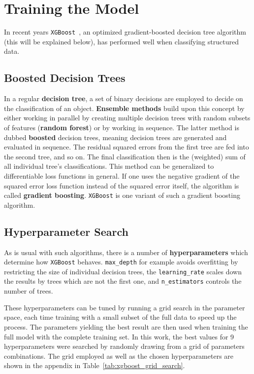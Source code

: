 \section{Training the Model}
In recent years \texttt{XGBoost}~, an optimized gradient-boosted decision tree algorithm (this will be explained below), has performed well when classifying structured data.

\subsection{Boosted Decision Trees}
In a regular \textbf{decision tree}, a set of binary decisions are employed to decide on the classification of an object. \textbf{Ensemble methods} build upon this concept by either working in parallel by creating multiple decision trees with random subsets of features (\textbf{random forest}) or by working in sequence. The latter method is dubbed \textbf{boosted} decision trees, meaning decision trees are generated and evaluated in sequence. The residual squared errors from the first tree are fed into the second tree, and so on. The final classification then is the (weighted) sum of all individual tree's classifications. This method can be generalized to differentiable loss functions in general. If one uses the negative gradient of the squared error loss function instead of the squared error itself, the algorithm is called \textbf{gradient boosting}. \texttt{XGBoost} is one variant of such a gradient boosting algorithm.

\subsection{Hyperparameter Search}
As is usual with such algorithms, there is a number of \textbf{hyperparameters} which determine how \texttt{XGBoost} behaves. \texttt{max\_depth} for example avoids overfitting by restricting the size of individual decision trees, the \texttt{learning\_rate} scales down the results by trees which are not the first one, and \texttt{n\_estimators} controls the number of trees.

These hyperparameters can be tuned by running a grid search in the parameter space, each time training with a small subset of the full data to speed up the process. The parameters yielding the best result are then used when training the full model with the complete training set. In this work, the best values for 9 hyperparameters were searched by randomly drawing from a grid of parameters combinations. The grid employed as well as the chosen hyperparameters are shown in the appendix in Table~\ref{tab:xgboost_grid_search}.

